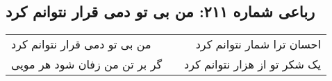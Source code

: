 \begin{center}
\section*{رباعی شماره ۲۱۱: من بی تو دمی قرار نتوانم کرد}
\label{sec:sh211}
\begin{longtable}{l p{0.5cm} r}
من بی تو دمی قرار نتوانم کرد
&&
احسان ترا شمار نتوانم کرد
\\
گر بر تن من زفان شود هر مویی
&&
یک شکر تو از هزار نتوانم کرد
\\
\end{longtable}
\end{center}
